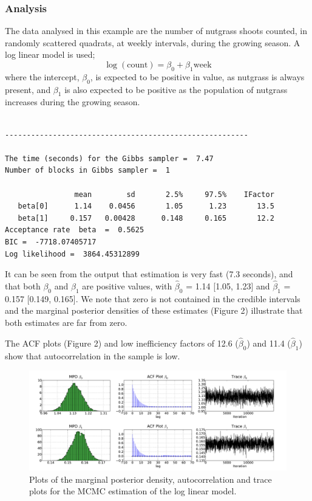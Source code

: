 \documentclass[article]{jss}
\begin{document}
\subsubsection{Analysis}

The data analysed in this example are the number of nutgrass shoots
counted, in randomly scattered quadrats, at weekly intervals, during
the growing season. A log linear model is used; \begin{equation}
  \log(\mbox{count})=\beta_{0}+\beta_{1}\mbox{week}\end{equation}
where the intercept, $\beta_{0}$, is expected to be positive in value,
as nutgrass is always present, and $\beta_{1}$ is also expected to be
positive as the population of nutgrass increases during the growing
season.

\begin{verbatim}

--------------------------------------------------------

The time (seconds) for the Gibbs sampler =  7.47
Number of blocks in Gibbs sampler =  1

                mean        sd       2.5%     97.5%    IFactor
   beta[0]      1.14    0.0456       1.05      1.23       13.5
   beta[1]     0.157   0.00428      0.148     0.165       12.2
Acceptance rate  beta  =  0.5625
BIC =  -7718.07405717
Log likelihood =  3864.45312899

\end{verbatim}

It can be seen from the output that estimation is very fast (7.3
seconds), and that both $\beta_{0}$ and $\beta_{1}$ are positive
values, with $\hat{\beta}_{0}$ = 1.14 {[}1.05, 1.23{]} and
$\hat{\beta}_{1}$ = 0.157 {[}0.149, 0.165{]}. We note that zero is not
contained in the credible intervals and the marginal posterior
densities of these estimates (Figure 2) illustrate that both estimates
are far from zero.

The ACF plots (Figure 2) and low inefficiency factors of 12.6
($\hat{\beta}_{0}$) and 11.4 ($\hat{\beta}_{1}$) show that
autocorrelation in the sample is low. %
\begin{figure}
  \begin{center}
    \includegraphics[width=16cm]{ex_loglinear.pdf}
  \end{center}
\caption{Plots of the marginal posterior density, autocorrelation and trace
plots for the MCMC estimation of the log linear model.}

\end{figure}
\end{document}
